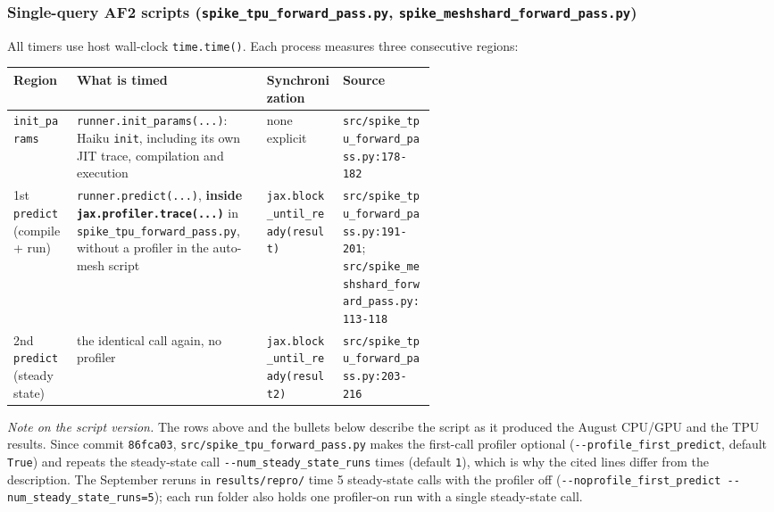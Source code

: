 \subsubsection{Single-query AF2 scripts (\texttt{spike\_tpu\_forward\_pass.py}, \texttt{spike\_meshshard\_forward\_pass.py})}
\label{sec:meth-timing-single}

All timers use host wall-clock \texttt{time.time()}. Each process measures three
consecutive regions:

\begin{center}\small
\begin{tabularx}{\linewidth}{>{\raggedright\arraybackslash}p{0.15\linewidth}>{\raggedright\arraybackslash}X>{\raggedright\arraybackslash}p{0.18\linewidth}>{\raggedright\arraybackslash}p{0.22\linewidth}}
\toprule
Region & What is timed & Synchronization & Source \\
\midrule
\texttt{init\_params} & \texttt{runner.init\_\allowbreak{}params(...)}: Haiku \texttt{init}, including its own JIT trace, compilation and execution & none explicit & \texttt{src/\allowbreak{}spike\_\allowbreak{}tpu\_\allowbreak{}forward\_\allowbreak{}pass.py:178-182} \\
1st \texttt{predict} (compile + run) & \texttt{runner.predict(...)}, \textbf{inside \texttt{jax.profiler.trace(...)}} in \texttt{spike\_\allowbreak{}tpu\_\allowbreak{}forward\_\allowbreak{}pass.py}, without a profiler in the auto-mesh script & \texttt{jax.block\_\allowbreak{}until\_\allowbreak{}ready(result)} & \texttt{src/\allowbreak{}spike\_\allowbreak{}tpu\_\allowbreak{}forward\_\allowbreak{}pass.py:191-201}; \texttt{src/\allowbreak{}spike\_\allowbreak{}meshshard\_\allowbreak{}forward\_\allowbreak{}pass.py:113-118} \\
2nd \texttt{predict} (steady state) & the identical call again, no profiler & \texttt{jax.block\_\allowbreak{}until\_\allowbreak{}ready(result2)} & \texttt{src/\allowbreak{}spike\_\allowbreak{}tpu\_\allowbreak{}forward\_\allowbreak{}pass.py:203-216} \\
\bottomrule
\end{tabularx}
\end{center}

\emph{Note on the script version.} The rows above and the bullets below describe the script
as it produced the August CPU/GPU and the TPU results. Since commit \texttt{86fca03},
\texttt{src/\allowbreak{}spike\_\allowbreak{}tpu\_\allowbreak{}forward\_\allowbreak{}pass.py} makes the first-call profiler optional
(\texttt{-{}-profile\_\allowbreak{}first\_\allowbreak{}predict}, default \texttt{True}) and repeats the steady-state call
\texttt{-{}-num\_\allowbreak{}steady\_\allowbreak{}state\_\allowbreak{}runs} times (default \texttt{1}), which is why the cited lines differ from
the description. The September reruns in \texttt{results/\allowbreak{}repro/} time 5 steady-state calls
with the profiler off (\texttt{-{}-noprofile\_\allowbreak{}first\_\allowbreak{}predict -{}-num\_\allowbreak{}steady\_\allowbreak{}state\_\allowbreak{}runs=5}); each
run folder also holds one profiler-on run with a single steady-state call.

